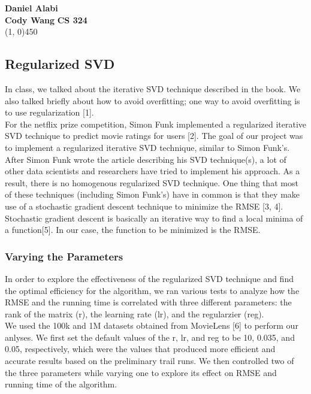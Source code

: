 \documentclass[12pt]{article}
\begin{document}
\noindent \textbf{Daniel Alabi} \\
\textbf{Cody Wang}
\hfill
\textbf{CS 324}\\
\line(1, 0){450} 

\subsection*{Regularized SVD}

In class, we talked about the iterative SVD technique described in the book.
We also talked briefly about how to avoid overfitting; one way to avoid
overfitting is to use regularization [1]. \\

\noindent For the netflix prize competition, Simon Funk implemented a regularized 
iterative SVD technique to predict movie ratings for users [2]. The goal of our
project was to implement a regularized iterative SVD technique, similar
to Simon Funk's. After Simon Funk wrote the article describing his
SVD technique(s), a lot of other data scientists and researchers
have tried to implement his approach. As a result, there is no homogenous
regularized SVD technique. One thing that most of these techniques (including
Simon Funk's) have in common is that they make use of a stochastic 
gradient descent technique to minimize the RMSE [3, 4]. Stochastic gradient 
descent is basically an iterative way to find a local minima of a function[5]. In our
case, the function to be minimized is the RMSE.


\subsubsection*{Varying the Parameters}

In order to explore the effectiveness of the regularized SVD technique and find
the optimal efficiency for the algorithm, we ran various tests to analyze how the
RMSE and the running time is correlated with three different parameters: the
rank of the matrix (r), the learning rate (lr), and the regularzier (reg).\\

\noindent We used the 100k and 1M datasets obtained from MovieLens [6] to perform our anlyses.
We first set the default values of the r, lr, and reg to be 10, 0.035, and 0.05,
respectively, which were the values that produced more efficient and accurate
results based on the preliminary trail runs. We then controlled two of the three
parameters while varying one to explore its effect on RMSE and running time of
the algorithm.\\
\end{document}
